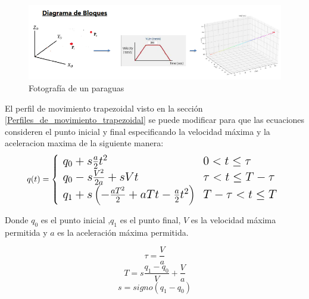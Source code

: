          \begin{figure}[htb]
            \centering
            \includegraphics[width=0.9\linewidth]{Main/Chapter6/Images6/cap6_trayectory_1.png}
            \caption{Fotografía de un paraguas}
            \label{f:cap6_trayectory_5}
        \end{figure}    
    \newpage
    
    \newpage
    
    El perfil de movimiento trapezoidal visto en la sección \ref{Perfiles_de_movimiento_trapezoidal} se puede modificar para que las ecuaciones consideren el punto inicial y final especificando la velocidad máxima y la aceleracion maxima de la siguiente manera:
        \begin{equation}
        \Large
            q(t) = \left\lbrace
                \begin{array}{ll}
                q_0 + s\frac{a}{2}t^2&   0< t \leq \tau\\
                q_0 - s\frac{V^2}{2a}+sVt &  \tau< t \leq T- \tau\\
                q_1 + s \left( -\frac{aT^2}{2}+aTt-\frac{a}{2}t^2 \right) &  T- \tau< t \leq T\\
            \end{array}
            \right.
            \label{eq:cap6_tray_1}
        \end{equation}

    Donde $q_0$ es el punto inicial ,$q_1$ es el punto final, $V$ es la velocidad máxima permitida y $a$ es la aceleración máxima permitida.


    \begin{equation}
        \tau=\frac{V}{a}
    \label{eq:cap6_tray_4}
    \end{equation}
    \begin{equation}
        T=s\frac{q_1-q_0}{V}+\frac{V}{a}
    \label{eq:cap6_tray_5}
    \end{equation}
    \begin{equation}
        s=signo(q_1-q_0)
    \label{eq:cap6_tray_6}
    \end{equation}
    

